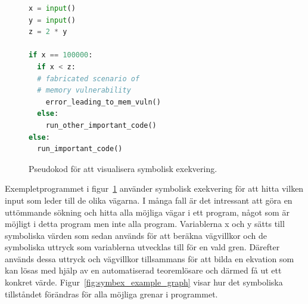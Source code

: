\begin{figure}
    \begin{lstlisting}[language=Python, frame=single]
x = input()
y = input()
z = 2 * y

if x == 100000:
  if x < z:
  # fabricated scenario of
  # memory vulnerability
    error_leading_to_mem_vuln()
  else:
    run_other_important_code()
else:
  run_important_code()

\end{lstlisting}
    \caption{Pseudokod för att visualisera symbolisk exekvering.}
    \label{fig:symbex_example_code}
\end{figure}

Exempletprogrammet i figur~\ref{fig:symbex_example_code} använder
symbolisk exekvering för att hitta vilken input som leder till de olika
vägarna. I många fall är det intressant att göra en uttömmande
sökning och hitta alla möjliga vägar i ett program, något som är möjligt i detta
program men inte alla program. Variablerna x och y sätts till symboliska värden
som sedan används för att beräkna vägvillkor och de symboliska uttryck som
variablerna utvecklas till för en vald gren. Därefter används dessa uttryck
och vägvillkor tillsammans för att bilda en ekvation som kan lösas med
hjälp av en automatiserad teoremlösare och därmed få ut ett konkret värde.
Figur~\ref{fig:symbex_example_graph} visar hur det symboliska tillståndet
förändras för alla möjliga grenar i programmet.

